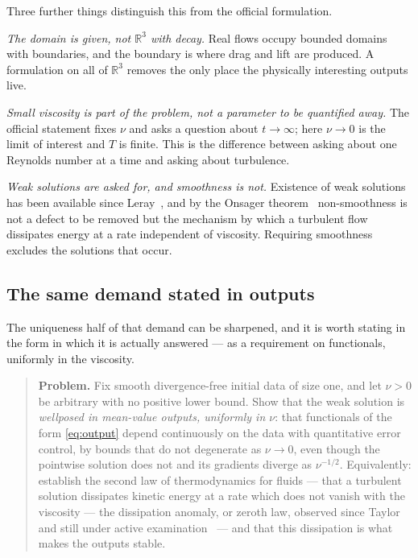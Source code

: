 \documentclass[11pt]{article}
\begin{document}
Three further things distinguish this from the official formulation.

\emph{The domain is given, not $\mathbb{R}^3$ with decay.} Real flows occupy bounded domains with
boundaries, and the boundary is where drag and lift are produced. A formulation on all of
$\mathbb{R}^3$ removes the only place the physically interesting outputs live.

\emph{Small viscosity is part of the problem, not a parameter to be quantified away.} The official
statement fixes $\nu$ and asks a question about $t\to\infty$; here $\nu\to0$ is the limit of
interest and $T$ is finite. This is the difference between asking about one Reynolds number at a
time and asking about turbulence.

\emph{Weak solutions are asked for, and smoothness is not.} Existence of weak solutions has been
available since Leray~\cite{leray}, and by the Onsager theorem~\cite{onsager,isett} non-smoothness
is not a defect to be removed but the mechanism by which a turbulent flow dissipates energy at a
rate independent of viscosity. Requiring smoothness excludes the solutions that occur.

\subsection{The same demand stated in outputs}\label{sec:reform}

The uniqueness half of that demand can be sharpened, and it is worth stating in the form in which it
is actually answered --- as a requirement on functionals, uniformly in the viscosity.

\begin{quote}
\textbf{Problem.} Fix smooth divergence-free initial data of size one, and let $\nu>0$ be arbitrary
with no positive lower bound. Show that the weak solution is \emph{wellposed in mean-value outputs,
uniformly in $\nu$}: that functionals of the form \eqref{eq:output} depend continuously on the data
with quantitative error control, by bounds that do not degenerate as $\nu\to0$, even though the
pointwise solution does not and its gradients diverge as $\nu^{-1/2}$. Equivalently: establish the
second law of thermodynamics for fluids --- that a turbulent solution dissipates kinetic energy at a
rate which does not vanish with the viscosity --- the dissipation anomaly, or zeroth law, observed
since Taylor~\cite{taylor} and still under active examination~\cite{iyer} --- and that this
dissipation is what makes the outputs
stable.
\end{quote}
\end{document}
